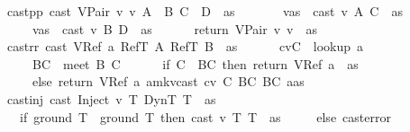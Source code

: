 \begin{isabellebody}
\ \ castpp{\isacharcolon}\ {\isachardoublequoteopen}cast\ {\isacharparenleft}VPair\ v{}\ v{}{\isacharparenright}\ {\isacharparenleft}A\ {\isasymtimes}\ B{\isacharparenright}\ {\isacharparenleft}C\ {\isasymtimes}\ D{\isacharparenright}\ {\isasymmu}\ as\ {\isacharequal}\ \isanewline
\ \ \ \ \ {\isacharparenleft}{\isacharparenleft}v{}{\isacharprime}{\isacharcomma}{\isasymmu}{}{\isacharcomma}as{}{\isacharparenright}\ {\isacharcolon}{\isacharequal}\ cast\ v{}\ A\ C\ {\isasymmu}\ as{\isacharsemicolon}\isanewline
\ \ \ \ \ \ {\isacharparenleft}v{}{\isacharprime}{\isacharcomma}{\isasymmu}{}{\isacharcomma}as{}{\isacharparenright}\ {\isacharcolon}{\isacharequal}\ cast\ v{}\ B\ D\ {\isasymmu}{}\ as{}{\isacharsemicolon}\isanewline
\ \ \ \ \ \ return\ {\isacharparenleft}VPair\ v{}{\isacharprime}\ v{}{\isacharprime}{\isacharcomma}\ {\isasymmu}{}{\isacharcomma}\ as{}{\isacharparenright}{\isacharparenright}{\isachardoublequoteclose}\ {\isacharbar}\isanewline
\ \ castrr{\isacharcolon}\ {\isachardoublequoteopen}cast\ {\isacharparenleft}VRef\ a{\isacharparenright}\ {\isacharparenleft}RefT\ A{\isacharparenright}\ {\isacharparenleft}RefT\ B{\isacharparenright}\ {\isasymmu}\ as\ {\isacharequal}\isanewline
\ \ \ \ \ {\isacharparenleft}{\isacharparenleft}cv{\isacharcomma}C{\isacharparenright}\ {\isacharcolon}{\isacharequal}\ lookup\ a\ {\isasymmu}{\isacharsemicolon}\isanewline
\ \ \ \ \ \ BC\ {\isacharcolon}{\isacharequal}\ meet\ B\ C{\isacharsemicolon}\isanewline
\ \ \ \ \ \ if\ C\ {\isasymsqsubseteq}\ BC\ then\ return\ {\isacharparenleft}VRef\ a{\isacharcomma}\ {\isasymmu}{\isacharcomma}\ as{\isacharparenright}\isanewline
\ \ \ \ \ \ else\ return\ {\isacharparenleft}VRef\ a{\isacharcomma}\ {\isacharparenleft}a{\isacharcomma}{\isacharparenleft}mk{\isacharunderscore}vcast\ cv\ C\ BC{\isacharcomma}\ BC{\isacharparenright}{\isacharparenright}{\isacharhash}{\isasymmu}{\isacharcomma}\ a{\isacharhash}as{\isacharparenright}{\isacharparenright}{\isachardoublequoteclose}\ {\isacharbar}\isanewline
\ \ castinj{\isacharcolon}\ {\isachardoublequoteopen}cast\ {\isacharparenleft}Inject\ v\ T{}{\isacharparenright}\ DynT\ T{}\ {\isasymmu}\ as\ {\isacharequal}\isanewline
\ \ \ \ {\isacharparenleft}if\ ground\ T{}\ {\isacharequal}\ ground\ T{}\ then\ cast\ v\ T{}\ T{}\ {\isasymmu}\ as\isanewline
\ \ \ \ \ else\ cast{\isacharunderscore}error{\isacharparenright}{\isachardoublequoteclose}\ {\isacharbar}\isanewline

\end{isabellebody}
